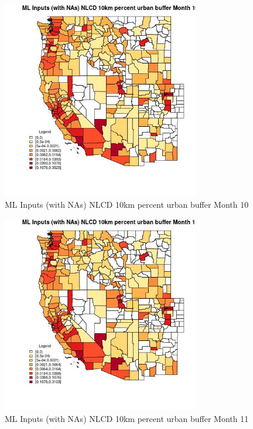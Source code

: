 \begin{figure} 
\centering  
\includegraphics[width=0.77\textwidth]{Code_Outputs/Report_ML_input_PM25_Step4_part_f_de_duplicated_aves_prioritize_24hr_obswNAs_CountyNLCD_10km_percent_urban_buffermedianMonth10.jpg} 
\caption{\label{fig:Report_ML_input_PM25_Step4_part_f_de_duplicated_aves_prioritize_24hr_obswNAsCountyNLCD_10km_percent_urban_buffermedianMonth10}ML Inputs (with NAs) NLCD 10km percent urban buffer Month 10} 
\end{figure} 
 

\begin{figure} 
\centering  
\includegraphics[width=0.77\textwidth]{Code_Outputs/Report_ML_input_PM25_Step4_part_f_de_duplicated_aves_prioritize_24hr_obswNAs_CountyNLCD_10km_percent_urban_buffermedianMonth11.jpg} 
\caption{\label{fig:Report_ML_input_PM25_Step4_part_f_de_duplicated_aves_prioritize_24hr_obswNAsCountyNLCD_10km_percent_urban_buffermedianMonth11}ML Inputs (with NAs) NLCD 10km percent urban buffer Month 11} 
\end{figure} 
 

